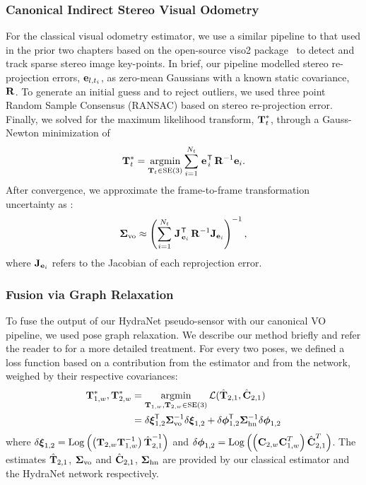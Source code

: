 \subsubsection{Canonical Indirect Stereo Visual Odometry}
For the classical visual odometry estimator, we use a similar pipeline to that used in the prior two chapters based on the open-source \textsf{viso2} package~\citep{Geiger2011-xe} to detect and track sparse stereo image key-points. In brief, our pipeline modelled stereo re-projection errors, $ \boldsymbol{\mathbf{e}}_{l,t_i}$, as zero-mean Gaussians with a known static covariance, $\boldsymbol{\mathbf{R}}$. To generate an initial guess and to reject outliers, we used three point Random Sample Consensus (RANSAC) based on stereo re-projection error.
Finally, we solved for the maximum likelihood transform, $\boldsymbol{\mathbf{T}}_t^*$, through a Gauss-Newton minimization of\begin{equation}
  \boldsymbol{\mathbf{T}}_{t}^* = \operatorname*{argmin}_{\boldsymbol{\mathbf{T}}_{t}\in\text{SE}(3)}\sum_{i=1}^{N_{t}} 
  \left.{\boldsymbol{\mathbf{e}}}\right.^{\mkern-1.0mu\mathsf{T}}_{i} \boldsymbol{\mathbf{R}}^{-1} \boldsymbol{\mathbf{e}}_{i}.
\end{equation}
\noindent After convergence, we approximate the frame-to-frame transformation uncertainty as \citep{Barfoot2017-ri}:
\begin{equation}
	\boldsymbol{\mathbf{\Sigma}}_\text{vo} \approx  \left( \sum_{i=1}^{N_t} \left.{\boldsymbol{\mathbf{J}}}\right.^{\mkern-1.0mu\mathsf{T}}_{\boldsymbol{\mathbf{e}}_i} \boldsymbol{\mathbf{R}}^{-1} \boldsymbol{\mathbf{J}}_{\boldsymbol{\mathbf{e}}_i} \right)^{-1},
    \label{eq:svo_uncertainty}
\end{equation}
where $\boldsymbol{\mathbf{J}}_{\boldsymbol{\mathbf{e}}_i}$ refers to the Jacobian of each reprojection error.

\subsubsection{Fusion via Graph Relaxation}

To fuse the output of our HydraNet pseudo-sensor with our canonical VO pipeline, we used pose graph relaxation. We describe our method briefly and refer the reader to \citep{Barfoot2017-ri} for a more detailed treatment. For every two poses, we defined a loss function based on a contribution from the estimator and from the network, weighed by their respective covariances:
\begin{align}
	\boldsymbol{\mathbf{T}}_{1,w}^*, \boldsymbol{\mathbf{T}}_{2,w}^* &= \operatorname*{argmin}_{\boldsymbol{\mathbf{T}}_{1,w}, \boldsymbol{\mathbf{T}}_{2,w}\in\text{SE}(3)}\mathcal{L}(\hat{\boldsymbol{\mathbf{T}}}_{2,1}, \hat{\boldsymbol{\mathbf{C}}}_{2,1}) \\ & = \delta\boldsymbol{\mathbf{\xi}}_\text{1,2}^{\mkern-1.0mu\mathsf{T}} \boldsymbol{\mathbf{\Sigma}}^{-1}_\text{vo} \delta\boldsymbol{\mathbf{\xi}}_\text{1,2} + \delta\boldsymbol{\mathbf{\phi}}_\text{1,2}^{\mkern-1.0mu\mathsf{T}} \boldsymbol{\mathbf{\Sigma}}^{-1}_{\text{hn}} \delta\boldsymbol{\mathbf{\phi}}_\text{1,2} 
\end{align}
where $\delta\boldsymbol{\mathbf{\xi}}_\text{1,2} =  \mathrm{Log}\left({\left(\boldsymbol{\mathbf{T}}_{2,w} \boldsymbol{\mathbf{T}}_{1,w}^{-1} \right)\hat{\boldsymbol{\mathbf{T}}}_{2,1}^{-1}}\right)$ and
$\delta\boldsymbol{\mathbf{\phi}}_\text{1,2} =  \mathrm{Log}\left({\left(\boldsymbol{\mathbf{C}}_{2,w} \boldsymbol{\mathbf{C}}_{1,w}^{T} \right)\hat{\boldsymbol{\mathbf{C}}}_{2,1}^{T}}\right)$.
The estimates $\hat{\boldsymbol{\mathbf{T}}}_{2,1}$, $\boldsymbol{\mathbf{\Sigma}}_\text{vo}$ and $\hat{\boldsymbol{\mathbf{C}}}_{2,1}$, $\boldsymbol{\mathbf{\Sigma}}_{\text{hn}}$ are provided by our classical estimator and the HydraNet network respectively.  

